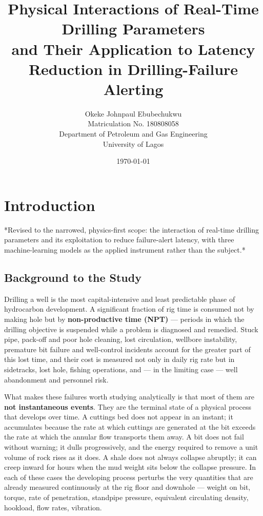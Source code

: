 \documentclass[12pt,a4paper]{report}
\title{\bfseries Physical Interactions of Real-Time Drilling Parameters\\ and Their Application to
Latency Reduction in Drilling-Failure Alerting}
\author{Okeke Johnpaul Ebubechukwu\\ Matriculation No. 180808058\\[6pt]
Department of Petroleum and Gas Engineering\\ University of Lagos}
\date{\today}
\begin{document}
\maketitle
\tableofcontents
\listoffigures
\clearpage

\chapter{Introduction}

*Revised to the narrowed, physics-first scope: the interaction of real-time drilling parameters and its
exploitation to reduce failure-alert latency, with three machine-learning models as the applied
instrument rather than the subject.*

\section{Background to the Study}

Drilling a well is the most capital-intensive and least predictable phase of hydrocarbon development.
A significant fraction of rig time is consumed not by making hole but by \textbf{non-productive time (NPT)} ---
periods in which the drilling objective is suspended while a problem is diagnosed and remedied. Stuck
pipe, pack-off and poor hole cleaning, lost circulation, wellbore instability, premature bit failure and
well-control incidents account for the greater part of this lost time, and their cost is measured not only
in daily rig rate but in sidetracks, lost hole, fishing operations, and --- in the limiting case --- well
abandonment and personnel risk.

What makes these failures worth studying analytically is that most of them are \textbf{not instantaneous
events}. They are the terminal state of a physical process that develops over time. A cuttings bed does
not appear in an instant; it accumulates because the rate at which cuttings are generated at the bit
exceeds the rate at which the annular flow transports them away. A bit does not fail without warning; it
dulls progressively, and the energy required to remove a unit volume of rock rises as it does. A shale
does not always collapse abruptly; it can creep inward for hours when the mud weight sits below the
collapse pressure. In each of these cases the developing process perturbs the very quantities that are
already measured continuously at the rig floor and downhole --- weight on bit, torque, rate of penetration,
standpipe pressure, equivalent circulating density, hookload, flow rates, vibration.
\end{document}
